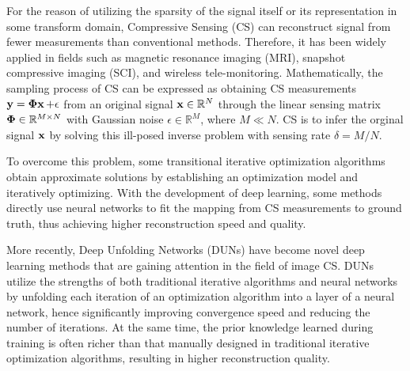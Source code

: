\documentclass[10pt,twocolumn,letterpaper]{article}
\begin{document}
For the reason of utilizing the sparsity of the signal itself or its representation in some transform domain, Compressive Sensing (CS) can reconstruct signal from fewer measurements than conventional methods\cite{candes2006robust, Donoho2006HighDimensionalCS}. Therefore, it has been widely applied in fields such as magnetic resonance imaging (MRI)\cite{Kontogiannis2022PhysicsInformedCS, Lustig2007SparseMT}, snapshot compressive imaging (SCI)\cite{Cheng2021MemoryEfficientNF}, and wireless tele-monitoring\cite{Zhang2012CompressedSF}. Mathematically, the sampling process of CS can be expressed as obtaining CS measurements $\operatorname{\mathbf{y}}=\operatorname{\mathbf{\Phi x}} + \epsilon$ from an original signal $\operatorname{\mathbf{x}}\in\mathbb{R}^N$ through the linear sensing matrix $\operatorname{\mathbf{\Phi}}\in\mathbb{R}^{M\times N}$ with Gaussian noise $\epsilon \in \mathbb{R}^M$, where $M \ll N$. CS is to infer the orginal signal $\operatorname{\mathbf{x}}$ by solving this ill-posed inverse problem with sensing rate $\delta = M / N$. 

To overcome this problem, some transitional iterative optimization algorithms\cite{Daubechies2003AnIT, beck2009fast, Donoho2009MessagepassingAF, Becker2009NESTAAF, afonso2010augmented, DBLP:journals/siamjo/Ochs19} obtain approximate solutions by establishing an optimization model and iteratively optimizing. With the development of deep learning, some methods\cite{kulkarni2016reconnet, shi2017deep, xu2018lapran, shi2019scalable, ye2021csformer, fan2022global} directly use neural networks to fit the mapping from CS measurements to ground truth, thus achieving higher reconstruction speed and quality.

More recently, Deep Unfolding Networks (DUNs) have become novel deep learning methods that are gaining attention in the field of image CS. DUNs\cite{DBLP:conf/icml/GregorL10, yang2018admm, zhang2018ista, zhang2020amp, you2021coast, shen2022transcs, song2021memory, Song2023OptimizationInspiredCT, DBLP:journals/ijcv/ChenSXZ23, guoCPPNet2024, wangUFCNet2024, DBLP:journals/tmm/CuiFZZ24, DBLP:journals/tmm/KongCH24} utilize the strengths of both traditional iterative algorithms and neural networks by unfolding each iteration of an optimization algorithm into a layer of a neural network, hence significantly improving convergence speed and reducing the number of iterations. At the same time, the prior knowledge learned during training is often richer than that manually designed in traditional iterative optimization algorithms, resulting in higher reconstruction quality.
\end{document}
